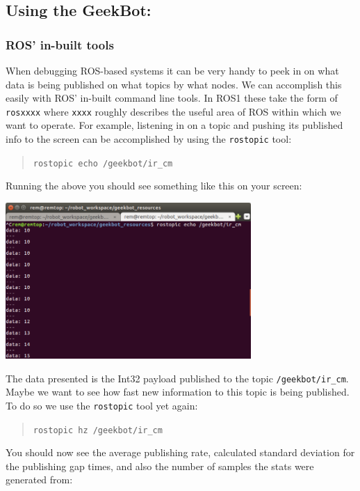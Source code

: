 \hypertarget{using-the-geekbot}{%
\subsection{Using the GeekBot:}\label{using-the-geekbot}}

\hypertarget{ros-in-built-tools}{%
\subsubsection{ROS' in-built tools}\label{ros-in-built-tools}}

When debugging ROS-based systems it can be very handy to peek in on what
data is being published on what topics by what nodes. We can accomplish
this easily with ROS' in-built command line tools. In ROS1 these take
the form of \texttt{rosxxxx} where \texttt{xxxx} roughly describes the
useful area of ROS within which we want to operate. For example,
listening in on a topic and pushing its published info to the screen can
be accomplished by using the \texttt{rostopic} tool:

\begin{quote}
\texttt{rostopic\ echo\ /geekbot/ir\_cm}
\end{quote}

Running the above you should see something like this on your screen:

\includegraphics[width=0.7\textwidth,height=\textheight]{figures/geekbot/repo_usage/echo_ir.png}

The data presented is the Int32 payload published to the topic
\texttt{/geekbot/ir\_cm}. Maybe we want to see how fast new information
to this topic is being published. To do so we use the \texttt{rostopic}
tool yet again:

\begin{quote}
\texttt{rostopic\ hz\ /geekbot/ir\_cm}
\end{quote}

You should now see the average publishing rate, calculated standard
deviation for the publishing gap times, and also the number of samples
the stats were generated from:

